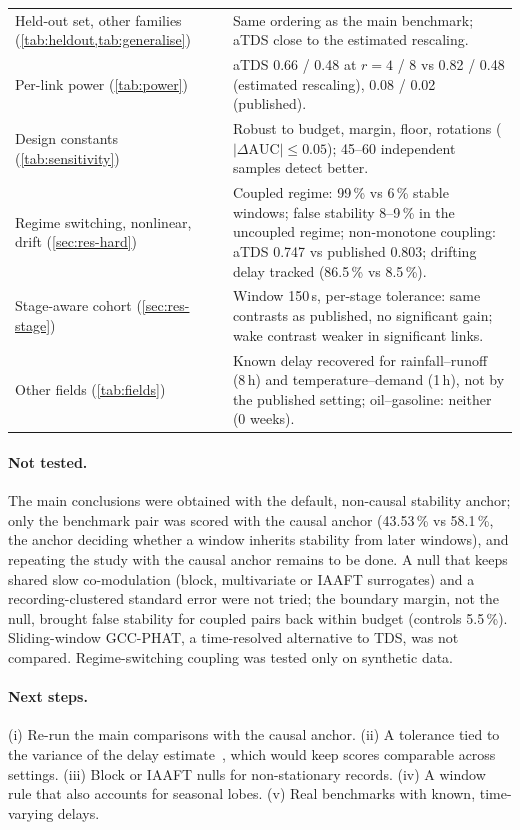 \documentclass[11pt,a4paper]{article}
\begin{document}
\begin{table}[t]
\begin{tabularx}{\textwidth}{>{\raggedright\arraybackslash}p{4.2cm}>{\raggedright\arraybackslash}X}
Held-out set, other families (\cref{tab:heldout,tab:generalise}) & Same ordering as the main benchmark; aTDS close to the estimated rescaling. \\
Per-link power (\cref{tab:power}) & aTDS 0.66 / 0.48 at $r = 4$ / 8 vs 0.82 / 0.48 (estimated rescaling), 0.08 / 0.02 (published). \\
Design constants (\cref{tab:sensitivity}) & Robust to budget, margin, floor, rotations ($|\Delta\mathrm{AUC}| \le 0.05$); 45--60 independent samples detect better. \\
Regime switching, nonlinear, drift (\cref{sec:res-hard}) & Coupled regime: 99\,\% vs 6\,\% stable windows; false stability 8--9\,\% in the uncoupled regime; non-monotone coupling: aTDS 0.747 vs published 0.803; drifting delay tracked (86.5\,\% vs 8.5\,\%). \\
Stage-aware cohort (\cref{sec:res-stage}) & Window 150\,s, per-stage tolerance: same contrasts as published, no significant gain; wake contrast weaker in significant links. \\
Other fields (\cref{tab:fields}) & Known delay recovered for rainfall--runoff (8\,h) and temperature--demand (1\,h), not by the published setting; oil--gasoline: neither (0 weeks). \\
\bottomrule
\end{tabularx}
\end{table}

\paragraph{Not tested.} The main conclusions were obtained with the default, non-causal stability anchor; only the benchmark pair was scored with the causal anchor (43.53\,\% vs 58.1\,\%, the anchor deciding whether a window inherits stability from later windows), and repeating the study with the causal anchor remains to be done. A null that keeps shared slow co-modulation (block, multivariate or IAAFT surrogates) and a recording-clustered standard error were not tried; the boundary margin, not the null, brought false stability for coupled pairs back within budget (controls 5.5\,\%). Sliding-window GCC-PHAT, a time-resolved alternative to TDS, was not compared. Regime-switching coupling was tested only on synthetic data.

\paragraph{Next steps.} (i) Re-run the main comparisons with the causal anchor. (ii) A tolerance tied to the variance of the delay estimate~\cite{Carter1987CoherenceTime}, which would keep scores comparable across settings. (iii) Block or IAAFT nulls for non-stationary records. (iv) A window rule that also accounts for seasonal lobes. (v) Real benchmarks with known, time-varying delays.
\end{document}
